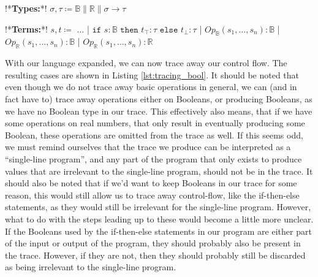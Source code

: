         \begin{quicklst}[caption=Booleans and operations in the language, label=lst:language_bools, gobble=12]
            !*\textbf{Types:}*!
                $\sigma,\tau\coloneqq\mathbb{B}\|\mathbb{R}\|\sigma\to\tau$

            !*\textbf{Terms:}*!
                $s,t\coloneqq$
                    $\dots$
                  | $\texttt{if }s:\mathbb{B}\texttt{ then }t_\top:\tau\texttt{ else }t_\bot:\tau$
                  | $Op_\mathbb{B}(s_1,\dots,s_n):\mathbb{B}$
                  | $Op_\mathbb{R}(s_1,\dots,s_n):\mathbb{B}$
                  | $Op_\mathbb{R}(s_1,\dots,s_n):\mathbb{R}$
        \end{quicklst}

        With our language expanded, we can now trace away our control flow.
        The resulting cases are shown in Listing \ref{lst:tracing_bool}.
        It should be noted that even though we do not trace away basic operations in general, we can (and in fact have to) trace away operations either on Booleans, or producing Booleans, as we have no Boolean type in our trace.
        This effectively also means, that if we have some operations on real numbers, that only result in eventually producing some Boolean, these operations are omitted from the trace as well.
        If this seems odd, we must remind ourselves that the trace we produce can be interpreted as a ``single-line program'', and any part of the program that only exists to produce values that are irrelevant to the single-line program, should not be in the trace.
        It should also be noted that if we'd want to keep Booleans in our trace for some reason, this would still allow us to trace away control-flow, like the if-then-else statements, as they would still be irrelevant for the single-line program.
        However, what to do with the steps leading up to these would become a little more unclear.
        If the Booleans used by the if-then-else statements in our program are either part of the input or output of the program, they should probably also be present in the trace.
        However, if they are not, then they should probably still be discarded as being irrelevant to the single-line program.

